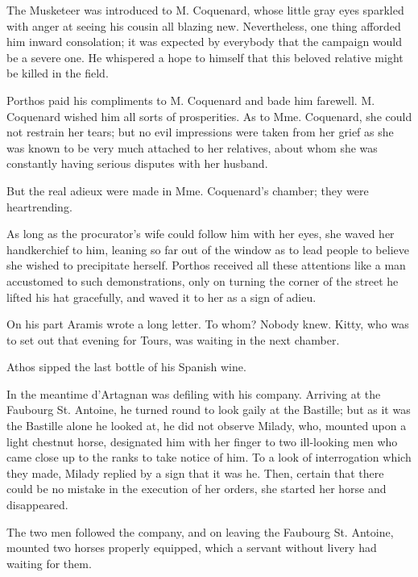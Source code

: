The Musketeer was introduced to M. Coquenard, whose little gray eyes sparkled with anger at seeing his cousin all blazing new. Nevertheless, one thing afforded him inward consolation; it was expected by everybody that the campaign would be a severe one. He whispered a hope to himself that this beloved relative might be killed in the field. 

Porthos paid his compliments to M. Coquenard and bade him farewell. M. Coquenard wished him all sorts of prosperities. As to Mme. Coquenard, she could not restrain her tears; but no evil impressions were taken from her grief as she was known to be very much attached to her relatives, about whom she was constantly having serious disputes with her husband. 

But the real adieux were made in Mme. Coquenard's chamber; they were heartrending. 

As long as the procurator's wife could follow him with her eyes, she waved her handkerchief to him, leaning so far out of the window as to lead people to believe she wished to precipitate herself. Porthos received all these attentions like a man accustomed to such demonstrations, only on turning the corner of the street he lifted his hat gracefully, and waved it to her as a sign of adieu. 

On his part Aramis wrote a long letter. To whom? Nobody knew. Kitty, who was to set out that evening for Tours, was waiting in the next chamber. 

Athos sipped the last bottle of his Spanish wine. 

In the meantime d'Artagnan was defiling with his company. Arriving at the Faubourg St. Antoine, he turned round to look gaily at the Bastille; but as it was the Bastille alone he looked at, he did not observe Milady, who, mounted upon a light chestnut horse, designated him with her finger to two ill-looking men who came close up to the ranks to take notice of him. To a look of interrogation which they made, Milady replied by a sign that it was he. Then, certain that there could be no mistake in the execution of her orders, she started her horse and disappeared. 

The two men followed the company, and on leaving the Faubourg St. Antoine, mounted two horses properly equipped, which a servant without livery had waiting for them. 